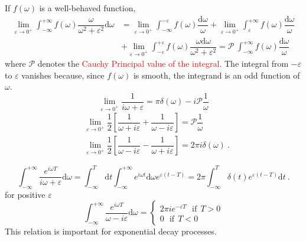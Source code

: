 \documentclass[12pt,a4paper]{article}
\newcommand{\dif}{\mathrm{d}}
\begin{document}
If $f(\omega)$ is a well-behaved function, 
\begin{align}
\nonumber \lim_{\varepsilon \rightarrow 0^+} \int_{-\infty}^{+\infty} f(\omega) \dfrac{\omega }{\omega^2 +\varepsilon^2} \dif \omega &= \lim_{\varepsilon \rightarrow 0^+} \int_{-\infty}^{-\varepsilon} f(\omega) \dfrac{\dif \omega }{\omega} + \lim_{\varepsilon \rightarrow 0^+} \int_{\varepsilon}^{+\infty} f(\omega) \dfrac{\dif \omega }{\omega} \\
&+\lim_{\varepsilon \rightarrow 0^+} \int_{-\varepsilon}^{+\varepsilon} f(\omega)  \dfrac{\omega \dif \omega}{\omega^2 +\varepsilon^2} = \mathcal{P}~  \int_{-\infty}^{+\infty} f(\omega) \dfrac{\dif \omega }{\omega}
\end{align}
where $\mathcal P$ denotes the \textcolor{red}{Cauchy Principal value of the integral}. The integral from $-\varepsilon$ to $\varepsilon$ vanishes because, since $f(\omega)$ is smooth, the integrand is an odd function of $\omega$.
\begin{equation}
\lim_{\varepsilon \rightarrow 0^+} \dfrac{1}{i\omega +\varepsilon} = \pi \delta(\omega) - i {\mathcal P} \dfrac{1}{\omega}
\end{equation}
\begin{align}
& \lim_{\varepsilon \rightarrow 0^+} \dfrac{1}{2} \left[\dfrac{1}{\omega +i\varepsilon} +\dfrac{1}{\omega -i\varepsilon} \right] = {\mathcal P} \dfrac{1}{\omega} \\
& \lim_{\varepsilon \rightarrow 0^+} \dfrac{1}{2} \left[\dfrac{1}{\omega -i\varepsilon} -\dfrac{1}{\omega +i\varepsilon} \right] = 2\pi i \delta(\omega) ~.
\end{align}

\begin{equation}
\int_{-\infty}^{+\infty} \dfrac{e^{i\omega T}}{i\omega +\varepsilon} \dif \omega = \int_{-\infty}^T \dif t \int_{-\infty}^{+\infty} e^{i\omega t} \dif \omega e^{\varepsilon(t-T)} = 2\pi \int_{-\infty}^T \delta(t) e^{\varepsilon(t-T)} \dif t ~.
\end{equation}
for positive $\varepsilon$
\begin{equation}
\int_{-\infty}^{+\infty} \dfrac{e^{i\omega T}}{\omega -i\varepsilon} \dif \omega = 
\begin{cases}
2\pi i e^{-\varepsilon T} ~~~ \text{if} ~~ T > 0 \\
0 ~~~\text{if} ~~ T < 0
\end{cases}
\end{equation}
This relation is important for exponential decay processes.
\end{document}
